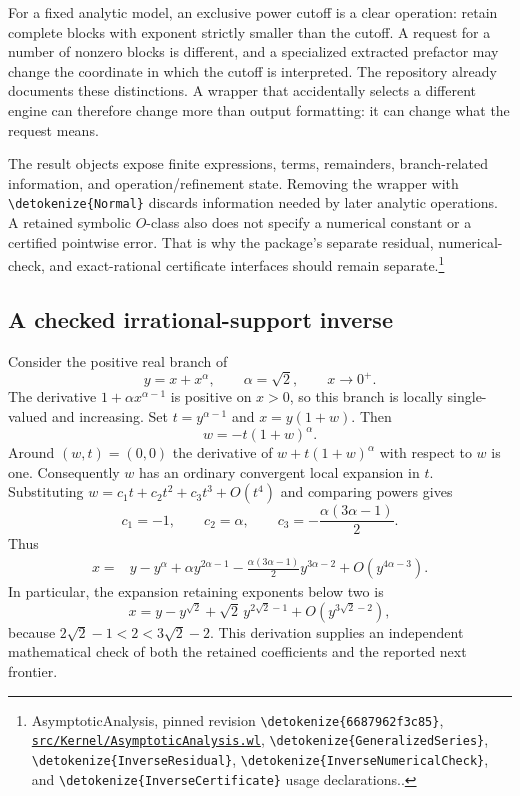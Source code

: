 \documentclass[11pt]{article}
\newcommand{\code}[1]{{\ttfamily\expandafter\nolinkurl\expandafter{\detokenize{#1}}}}
\newcommand{\repo}{https://github.com/VladimirReshetnikov/Asymptotic/blob/6687962f3c858a4f93623cfc496f33e35c6763d4/}
\newcommand{\src}[2]{\footnote{AsymptoticAnalysis, pinned revision \code{6687962f3c85}, \href{\repo#1}{\nolinkurl{#1}}, #2.}}
\begin{document}
For a fixed analytic model, an exclusive power cutoff is a clear operation: retain complete blocks with exponent strictly smaller than the cutoff. A request for a number of nonzero blocks is different, and a specialized extracted prefactor may change the coordinate in which the cutoff is interpreted. The repository already documents these distinctions. A wrapper that accidentally selects a different engine can therefore change more than output formatting: it can change what the request means.

The result objects expose finite expressions, terms, remainders, branch-related information, and operation/refinement state. Removing the wrapper with \code{Normal} discards information needed by later analytic operations. A retained symbolic $O$-class also does not specify a numerical constant or a certified pointwise error. That is why the package's separate residual, numerical-check, and exact-rational certificate interfaces should remain separate.\src{src/Kernel/AsymptoticAnalysis.wl}{\code{GeneralizedSeries}, \code{InverseResidual}, \code{InverseNumericalCheck}, and \code{InverseCertificate} usage declarations.}

\subsection{A checked irrational-support inverse}
Consider the positive real branch of
\[
 y=x+x^\alpha,\qquad \alpha=\sqrt2,\qquad x\to0^+.
\]
The derivative $1+\alpha x^{\alpha-1}$ is positive on $x>0$, so this branch is locally single-valued and increasing. Set $t=y^{\alpha-1}$ and $x=y(1+w)$. Then
\[
 w=-t(1+w)^\alpha.
\]
Around $(w,t)=(0,0)$ the derivative of $w+t(1+w)^\alpha$ with respect to $w$ is one. Consequently $w$ has an ordinary convergent local expansion in $t$. Substituting $w=c_1t+c_2t^2+c_3t^3+O(t^4)$ and comparing powers gives
\[
 c_1=-1,\qquad c_2=\alpha,\qquad
 c_3=-\frac{\alpha(3\alpha-1)}2.
\]
Thus
\begin{align*}
 x={}&y-y^\alpha+\alpha y^{2\alpha-1}
 -\frac{\alpha(3\alpha-1)}2y^{3\alpha-2}
 +O(y^{4\alpha-3}).
\end{align*}
In particular, the expansion retaining exponents below two is
\[
 x=y-y^{\sqrt2}+\sqrt2\,y^{2\sqrt2-1}
   +O(y^{3\sqrt2-2}),
\]
because $2\sqrt2-1<2<3\sqrt2-2$. This derivation supplies an independent mathematical check of both the retained coefficients and the reported next frontier.
\end{document}
